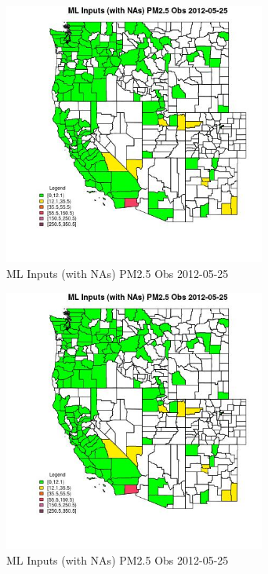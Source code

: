 
\clearpage 

\begin{figure} 
\centering  
\includegraphics[width=0.77\textwidth]{Code_Outputs/Report_ML_input_PM25_Step4_part_e_de_duplicated_aves_compiled_2019-05-18wNAs_CountyPM25_ObsMean2012-05-25.jpg} 
\caption{\label{fig:Report_ML_input_PM25_Step4_part_e_de_duplicated_aves_compiled_2019-05-18wNAsCountyPM25_ObsMean2012-05-25}ML Inputs (with NAs) PM2.5 Obs 2012-05-25} 
\end{figure} 
 

\clearpage 

\begin{figure} 
\centering  
\includegraphics[width=0.77\textwidth]{Code_Outputs/Report_ML_input_PM25_Step4_part_e_de_duplicated_aves_compiled_2019-05-18wNAs_CountyPM25_ObsMean2012-05-25.jpg} 
\caption{\label{fig:Report_ML_input_PM25_Step4_part_e_de_duplicated_aves_compiled_2019-05-18wNAsCountyPM25_ObsMean2012-05-25}ML Inputs (with NAs) PM2.5 Obs 2012-05-25} 
\end{figure} 
 

